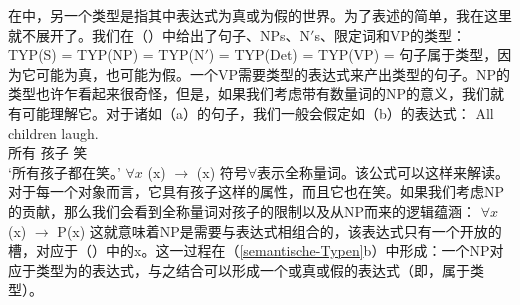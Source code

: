 在中，另一个类型是指其中表达式为真或为假的世界。为了表述的简单，我在这里就不展开了。我们在（）中给出了句子、NPs、N$'$s、限定词和VP的类型：
\eal
\label{semantische-Typen}
\ex TYP(S)   = 
\ex TYP(NP)  = 
\ex TYP(N$'$)  = 
\ex TYP(Det) = 
\ex TYP(VP)  = 
\zl
句子属于类型，因为它可能为真，也可能为假。一个VP需要类型的表达式来产出类型的句子。NP的类型也许乍看起来很奇怪，但是，如果我们考虑带有数量词的NP的意义，我们就有可能理解它。对于诸如（a）的句子，我们一般会假定如（b）的表达式：
\eal
\ex 
\gll All children laugh.\\
所有 孩子 笑\\
\glt `所有孩子都在笑。'
\ex $\forall x$ (x) $\to$ (x)
\zl
符号$\forall$表示全称量词。该公式可以这样来解读。对于每一个对象而言，它具有孩子这样的属性，而且它也在笑。如果我们考虑NP的贡献，那么我们会看到全称量词对孩子的限制以及从NP而来的逻辑蕴涵：
\ea
$\forall x$ (x) $\to$ P(x)
\z
这就意味着NP是需要与表达式相组合的，该表达式只有一个开放的槽，对应于（）中的x。这一过程在（\ref{semantische-Typen}b）中形成：一个NP对应于类型为的表达式，与之结合可以形成一个或真或假的表达式（即，属于类型）。

